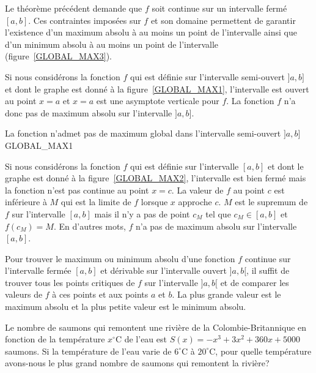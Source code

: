 {Le théorème précédent demande que $f$ soit continue sur un intervalle
fermé $[a,b]$.  Ces contraintes imposées sur $f$ et son domaine
permettent de garantir l'existence d'un maximum absolu à au moins 
un point de l'intervalle ainsi que d'un minimum absolu à au moins 
un point de l'intervalle (figure~\ref{GLOBAL_MAX3}).


Si nous considérons la fonction $f$ qui est définie sur l'intervalle
semi-ouvert $]a,b]$ et dont le graphe est donné à la
figure~\ref{GLOBAL_MAX1}, l'intervalle est ouvert au point $x=a$ et
$x=a$ est une asymptote verticale pour $f$.  La fonction $f$ n'a donc
pas de maximum absolu sur l'intervalle $]a,b]$.

{La fonction n'admet pas de maximum global dans l'intervalle
semi-ouvert $]a,b]$}{GLOBAL_MAX1} 

Si nous considérons la fonction $f$ qui est définie sur l'intervalle
$[a,b]$ et dont le graphe est donné à la figure~\ref{GLOBAL_MAX2},
l'intervalle est bien fermé mais la fonction n'est pas continue au
point $x=c$.  La valeur de $f$ au point $c$ est inférieure à $M$ qui
est la limite de $f$ lorsque $x$ approche $c$.  $M$ est le supremum de
$f$ sur l'intervalle $[a,b]$ mais il n'y a pas de point $c_M$ tel que
$c_M \in [a,b]$ et $f(c_M) = M$.  En d'autres mots, $f$ n'a pas de
maximum absolu sur l'intervalle $[a,b]$.


\begin{focus}{\mth} \label{mthmaxth}
Pour trouver le maximum ou minimum absolu d'une fonction $f$ continue
sur l'intervalle fermée $[a,b]$ et dérivable sur l'intervalle ouvert
$]a,b[$, il suffit de trouver tous les points critiques de $f$ sur
l'intervalle $]a,b[$ et de comparer les valeurs de $f$ à ces points et
aux points $a$ et $b$.  La plus grande valeur est le maximum absolu et
la plus petite valeur est le minimum absolu.
\end{focus}

\begin{egg}
Le nombre de saumons qui remontent une rivière de la
Colombie-Britannique en fonction de la température $x^\circ$C de l'eau
est $S(x) = -x^3 + 3 x^2 +360 x + 5000$ saumons.  Si la température de
l'eau varie de $6^\circ$C à $20^\circ$C, pour quelle température
avons-nous le plus grand nombre de saumons qui remontent la rivière?


\end{egg}}
